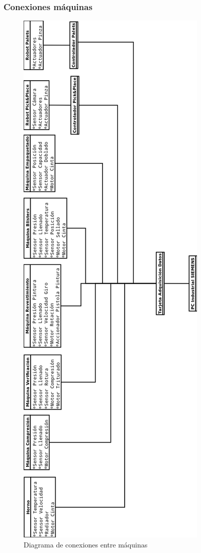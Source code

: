 \subsubsection{Conexiones máquinas}
\hfill
	\begin{figure}[htp]
			\centering
			\includegraphics[scale=0.35]{Planos/conexiones.png}
			\caption{Diagrama de conexiones entre máquinas}
			\label{fig:testa}
	\end{figure}

